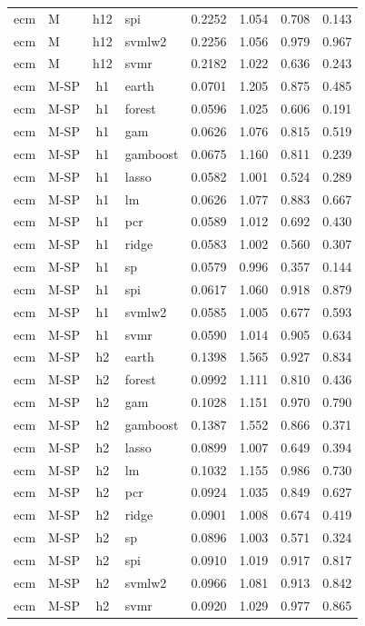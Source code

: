 \begin{ThreePartTable}
\begin{longtable}[t]{llclcccc}
ecm & M & h12 & spi & 0.2252 & 1.054 & 0.708 & 0.143\\
ecm & M & h12 & svmlw2 & 0.2256 & 1.056 & 0.979 & 0.967\\
ecm & M & h12 & svmr & 0.2182 & 1.022 & 0.636 & 0.243\\
\addlinespace
ecm & M-SP & h1 & earth & 0.0701 & 1.205 & 0.875 & 0.485\\
ecm & M-SP & h1 & forest & 0.0596 & 1.025 & 0.606 & 0.191\\
ecm & M-SP & h1 & gam & 0.0626 & 1.076 & 0.815 & 0.519\\
ecm & M-SP & h1 & gamboost & 0.0675 & 1.160 & 0.811 & 0.239\\
ecm & M-SP & h1 & lasso & 0.0582 & 1.001 & 0.524 & 0.289\\
ecm & M-SP & h1 & lm & 0.0626 & 1.077 & 0.883 & 0.667\\
ecm & M-SP & h1 & pcr & 0.0589 & 1.012 & 0.692 & 0.430\\
ecm & M-SP & h1 & ridge & 0.0583 & 1.002 & 0.560 & 0.307\\
ecm & M-SP & h1 & sp & 0.0579 & 0.996 & 0.357 & 0.144\\
ecm & M-SP & h1 & spi & 0.0617 & 1.060 & 0.918 & 0.879\\
ecm & M-SP & h1 & svmlw2 & 0.0585 & 1.005 & 0.677 & 0.593\\
ecm & M-SP & h1 & svmr & 0.0590 & 1.014 & 0.905 & 0.634\\
\addlinespace
ecm & M-SP & h2 & earth & 0.1398 & 1.565 & 0.927 & 0.834\\
ecm & M-SP & h2 & forest & 0.0992 & 1.111 & 0.810 & 0.436\\
ecm & M-SP & h2 & gam & 0.1028 & 1.151 & 0.970 & 0.790\\
ecm & M-SP & h2 & gamboost & 0.1387 & 1.552 & 0.866 & 0.371\\
ecm & M-SP & h2 & lasso & 0.0899 & 1.007 & 0.649 & 0.394\\
ecm & M-SP & h2 & lm & 0.1032 & 1.155 & 0.986 & 0.730\\
ecm & M-SP & h2 & pcr & 0.0924 & 1.035 & 0.849 & 0.627\\
ecm & M-SP & h2 & ridge & 0.0901 & 1.008 & 0.674 & 0.419\\
ecm & M-SP & h2 & sp & 0.0896 & 1.003 & 0.571 & 0.324\\
ecm & M-SP & h2 & spi & 0.0910 & 1.019 & 0.917 & 0.817\\
ecm & M-SP & h2 & svmlw2 & 0.0966 & 1.081 & 0.913 & 0.842\\
ecm & M-SP & h2 & svmr & 0.0920 & 1.029 & 0.977 & 0.865\\

\end{longtable}
\end{ThreePartTable}
